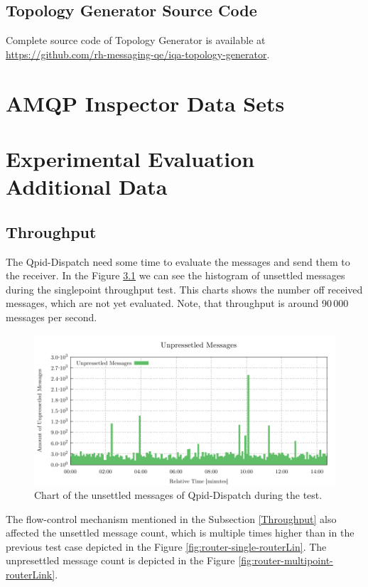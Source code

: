 \section{Topology Generator Source Code}
\label{AP:Topology Generator Source Code}
Complete source code of Topology Generator is available at \url{https://github.com/rh-messaging-qe/iqa-topology-generator}.

\chapter{AMQP Inspector Data Sets}
\label{AMQP Inspector Data Sets}

\chapter{Experimental Evaluation Additional Data}
\label{Experimental Evaluation Additional Data}

\section{Throughput}
The Qpid-Dispatch need some time to evaluate the messages and send them to the receiver. In the Figure \ref{fig:router-single-routerLink} we can see the histogram of unsettled messages during the singlepoint throughput test. This charts shows the number off received messages, which are not yet evaluated. Note, that throughput is around 90\,000 messages per second.

\begin{figure}[H]
	\centering
	\includegraphics[width=1\linewidth]{obrazky-figures/charts/singlepoint-router-throughput-routerLink.pdf}
	\caption{Chart of the unsettled messages of Qpid-Dispatch during the test.}
	\label{fig:router-single-routerLink}
\end{figure}

The flow-control mechanism mentioned in the Subsection \ref{Throughput} also affected the unsettled message count, which is multiple times higher than in the previous test case depicted in the Figure \ref{fig:router-single-routerLin}. The unpresettled message count is depicted in the Figure \ref{fig:router-multipoint-routerLink}.

